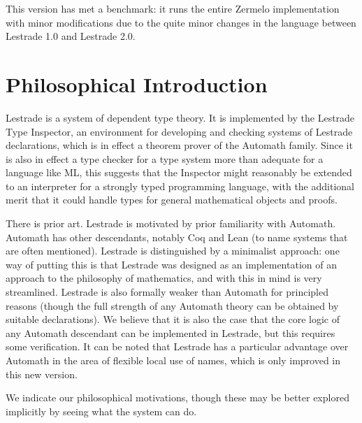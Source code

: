 \documentclass[12pt]{article}
\begin{document}
This version has met a benchmark:  it runs the entire Zermelo implementation with minor modifications due to the quite minor changes in the language between Lestrade 1.0 and Lestrade 2.0.

\newpage

\section{Philosophical Introduction}

Lestrade is a system of dependent type theory.  It is implemented by the Lestrade Type Inspector, an environment for developing and checking systems of Lestrade declarations, which is in effect a theorem prover of the Automath family.  Since it is also in effect a type checker for a type system more than adequate for a language like ML, this suggests that the Inspector might reasonably be extended to an interpreter for a strongly typed programming language, with the additional merit that it could handle types for general mathematical objects and proofs.

There is prior art.  Lestrade is motivated by prior familiarity with Automath.  Automath has other descendants, notably Coq and Lean (to name systems that are often mentioned).  Lestrade is distinguished by a minimalist approach:  one way of putting this is that Lestrade was designed as an implementation of an approach to the philosophy of mathematics, and with this in mind is very streamlined.  Lestrade is also formally weaker than Automath for principled reasons (though the full strength of any Automath theory can be obtained by suitable declarations).  We believe that it is also the case that the core logic of any Automath descendant can be implemented in Lestrade, but this requires some verification.  It can be noted that Lestrade has a particular advantage over Automath in the area of flexible local use of names, which is only improved in this new version.

We indicate our philosophical motivations, though these may be better explored implicitly by seeing what the system can do.
\end{document}

